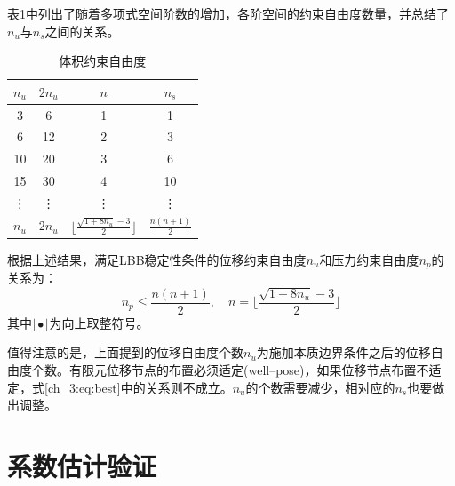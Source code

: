表\ref{ch_3:tab:constraint}中列出了随着多项式空间阶数的增加，各阶空间的约束自由度数量，并总结了$n_u$与$n_s$之间的关系。
\begin{table}[!h]
    \centering
    \caption{体积约束自由度}\label{ch_3:tab:constraint}
    \setlength{\tabcolsep}{10mm}
    \renewcommand{\arraystretch}{2}
    \begin{tabular}{cccc}
        \toprule
            $n_u$ & $2n_u$ & $n$ &$ n_s$\\
        \midrule
        3  & 6  & 1 & 1 \\
        6  & 12 & 2 & 3 \\
        10 & 20 & 3 & 6 \\
        15 & 30 & 4 & 10 \\
        \vdots & \vdots & \vdots & \vdots \\
        $n_u$ & $2n_u$ & $\lfloor\frac{\sqrt{1+8n_u}-3}{2}\rfloor$ & $\frac{n(n+1)}{2}$  \\
        \bottomrule
    \end{tabular}
\end{table}

根据上述结果，满足LBB稳定性条件的位移约束自由度$n_u$和压力约束自由度$n_p$的关系为：
\begin{equation}\label{ch_3:eq:best}
n_p\leq \frac{n(n+1)}{2},\quad n = \lfloor\frac{\sqrt{1+8n_u}-3}{2}\rfloor
\end{equation}
其中$\lfloor\bullet\rfloor$为向上取整符号。

值得注意的是，上面提到的位移自由度个数$n_u$为施加本质边界条件之后的位移自由度个数。有限元位移节点的布置必须适定(well--pose)，如果位移节点布置不适定，式\eqref{ch_3:eq:best}中的关系则不成立。$n_u$的个数需要减少，相对应的$n_s$也要做出调整。
\section{系数估计验证}

